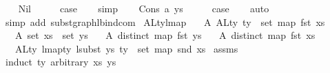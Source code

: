 \begin{isabellebody}
\ \ \isamarkupfalse%
\ Nil\isanewline
\ \ \isamarkupfalse%
\ \isamarkupfalse%
\ {\isacharquery}{\kern0pt}case\isanewline
\ \ \isamarkupfalse%
\ simp\isanewline
{}\isamarkupfalse%
\isanewline
\ \ \isamarkupfalse%
\ {\isacharparenleft}{\kern0pt}Cons\ a\ ys{\isacharparenright}{\kern0pt}\isanewline
\ \ \isamarkupfalse%
\ \isamarkupfalse%
\ {\isacharquery}{\kern0pt}case\isanewline
\ \ \isamarkupfalse%
\ auto\isanewline
\ \ \isamarkupfalse%
\ {\isacharparenleft}{\kern0pt}simp\ add{\isacharcolon}{\kern0pt}\ subst{\isacharunderscore}{\kern0pt}graph{\isacharunderscore}{\kern0pt}lbind{\isacharunderscore}{\kern0pt}com{\isacharparenright}{\kern0pt}\isanewline
{}\isamarkupfalse%
%
\endisatagproof
{\isafoldproof}%
%
\isadelimproof
\isanewline
%
\endisadelimproof
\isanewline
\isanewline
\isanewline
\isanewline
\isanewline
\isanewline
\isanewline
{}\isamarkupfalse%
\ ALty{\isacharunderscore}{\kern0pt}lmap{\isacharcolon}{\kern0pt}\isanewline
\ \ \ A{}{\isacharcolon}{\kern0pt}\ {\isachardoublequoteopen}ALty\ ty\ {\isacharequal}{\kern0pt}\ set\ {\isacharparenleft}{\kern0pt}map\ fst\ xs{\isacharparenright}{\kern0pt}{\isachardoublequoteclose}\isanewline
\ \ \ A{}{\isacharcolon}{\kern0pt}\ {\isachardoublequoteopen}set\ xs\ {\isasymsubseteq}\ set\ ys{\isachardoublequoteclose}\isanewline
\ \ \ A{}{\isacharcolon}{\kern0pt}\ {\isachardoublequoteopen}distinct\ {\isacharparenleft}{\kern0pt}map\ fst\ ys{\isacharparenright}{\kern0pt}{\isachardoublequoteclose}\isanewline
\ \ \ A{}{\isacharcolon}{\kern0pt}\ {\isachardoublequoteopen}distinct\ {\isacharparenleft}{\kern0pt}map\ fst\ xs{\isacharparenright}{\kern0pt}{\isachardoublequoteclose}\isanewline
\ \ \ {\isachardoublequoteopen}ALty\ {\isacharparenleft}{\kern0pt}lmap{\isacharunderscore}{\kern0pt}ty\ {\isacharparenleft}{\kern0pt}lsubst\ ys{\isacharparenright}{\kern0pt}\ ty{\isacharparenright}{\kern0pt}\ {\isacharequal}{\kern0pt}\ set\ {\isacharparenleft}{\kern0pt}map\ snd\ xs{\isacharparenright}{\kern0pt}{\isachardoublequoteclose}\isanewline
%
\isadelimproof
%
\endisadelimproof
%
\isatagproof
{}\isamarkupfalse%
\ assms\isanewline
{}\isamarkupfalse%
\ {\isacharparenleft}{\kern0pt}induct\ ty\ arbitrary{\isacharcolon}{\kern0pt}\ xs\ ys{\isacharparenright}{\kern0pt}\isanewline

\end{isabellebody}
